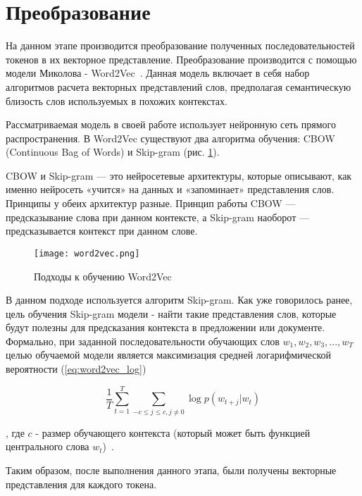 \section{Преобразование}

На данном этапе производится преобразование полученных последовательностей токенов в их векторное представление. Преобразование производится с помощью модели Миколова - Word2Vec~\cite{word2vec}. Данная модель включает в себя набор алгоритмов расчета векторных представлений слов, предполагая семантическую близость слов используемых в похожих контекстах.

Рассматриваемая модель в своей работе использует нейронную сеть прямого распространения. В Word2Vec существуют два алгоритма обучения: CBOW (Continuous Bag of Words) и Skip-gram (рис. \ref{fig:word2vec}).


CBOW и Skip-gram — это нейросетевые архитектуры, которые описывают, как именно нейросеть «учится» на данных и «запоминает» представления слов. Принципы у обеих архитектур разные. Принцип работы CBOW — предсказывание слова при данном контексте, а Skip-gram наоборот — предсказывается контекст при данном слове.

\begin{figure}[htbp]
\centering
\texttt{[image: word2vec.png]}
\caption{Подходы к обучению Word2Vec}
\label{fig:word2vec}
\end{figure}

В данном подходе используется алгоритм Skip-gram. Как уже говорилось ранее, цель обучения Skip-gram модели - найти такие представления слов, которые будут полезны для предсказания контекста в предложении или документе. Формально, при заданной последовательности обучающих слов \(w_1, w_2, w_3,...,w_T\) целью обучаемой модели является максимизация средней логарифмической вероятности (\ref{eq:word2vec_log})

\begin{equation}
\label{eq:word2vec_log}
\frac{1}{T}\sum_{t=1}^{T}\sum_{-c \leq j \leq c,j\neq0}\log p(w_{t+j}|w_t)
\end{equation}

, где \(c\) - размер обучающего контекста (который может быть функцией центрального слова \(w_t\))~\cite{word2vec}.

Таким образом, после выполнения данного этапа, были получены векторные представления для каждого токена.
